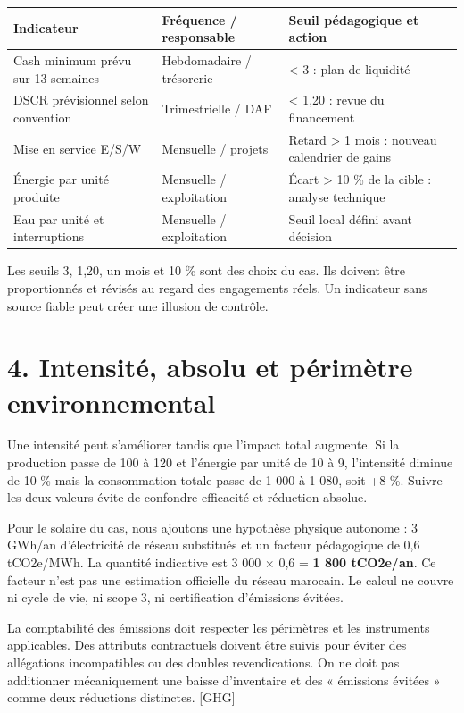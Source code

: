 \documentclass[12pt,a4paper]{article}
\begin{document}
\Needspace{250pt}
\begin{longtable}{p{5.07cm}p{5.07cm}p{5.07cm}}
\toprule
Indicateur & Fréquence / responsable & Seuil pédagogique et action \\
\midrule\endhead
Cash minimum prévu sur 13 semaines & Hebdomadaire / trésorerie & < 3 : plan de liquidité \\
DSCR prévisionnel selon convention & Trimestrielle / DAF & < 1,20 : revue du financement \\
Mise en service E/S/W & Mensuelle / projets & Retard > 1 mois : nouveau calendrier de gains \\
Énergie par unité produite & Mensuelle / exploitation & Écart > 10 \% de la cible : analyse technique \\
Eau par unité et interruptions & Mensuelle / exploitation & Seuil local défini avant décision \\
\bottomrule
\end{longtable}

Les seuils 3, 1,20, un mois et 10 \% sont des choix du cas. Ils doivent être proportionnés et révisés au regard des engagements réels. Un indicateur sans source fiable peut créer une illusion de contrôle.

\section*{4. Intensité, absolu et périmètre environnemental}
Une intensité peut s’améliorer tandis que l’impact total augmente. Si la production passe de 100 à 120 et l’énergie par unité de 10 à 9, l’intensité diminue de 10 \% mais la consommation totale passe de 1 000 à 1 080, soit +8 \%. Suivre les deux valeurs évite de confondre efficacité et réduction absolue.


Pour le solaire du cas, nous ajoutons une hypothèse physique autonome : 3 GWh/an d’électricité de réseau substitués et un facteur pédagogique de 0,6 tCO2e/MWh. La quantité indicative est 3 000 $\times$ 0,6 = \textbf{1 800 tCO2e/an}. Ce facteur n’est pas une estimation officielle du réseau marocain. Le calcul ne couvre ni cycle de vie, ni scope 3, ni certification d’émissions évitées.


La comptabilité des émissions doit respecter les périmètres et les instruments applicables. Des attributs contractuels doivent être suivis pour éviter des allégations incompatibles ou des doubles revendications. On ne doit pas additionner mécaniquement une baisse d’inventaire et des « émissions évitées » comme deux réductions distinctes. [GHG]
\end{document}
